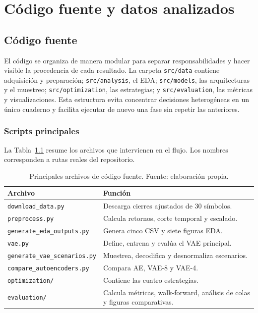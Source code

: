 \chapter{Código fuente y datos analizados}

\section{Código fuente}

El código se organiza de manera modular para separar responsabilidades y hacer visible la procedencia de cada resultado. La carpeta \texttt{src/data} contiene adquisición y preparación; \texttt{src/analysis}, el EDA; \texttt{src/models}, las arquitecturas y el muestreo; \texttt{src/optimization}, las estrategias; y \texttt{src/evaluation}, las métricas y visualizaciones. Esta estructura evita concentrar decisiones heterogéneas en un único cuaderno y facilita ejecutar de nuevo una fase sin repetir las anteriores.



\subsection{Scripts principales}

La Tabla~\ref{tab:codigo_fuente} resume los archivos que intervienen en el flujo. Los nombres corresponden a rutas reales del repositorio.

\begin{table}[htbp]
\centering
\scriptsize
\begin{tabular}{p{}p{}}
\toprule
Archivo & Función \\
\midrule
\texttt{download\_data.py} & Descarga cierres ajustados de 30 símbolos. \\
\texttt{preprocess.py} & Calcula retornos, corte temporal y escalado. \\
\texttt{generate\_eda\_outputs.py} & Genera cinco CSV y siete figuras EDA. \\
\texttt{vae.py} & Define, entrena y evalúa el VAE principal. \\
\texttt{generate\_vae\_scenarios.py} & Muestrea, decodifica y desnormaliza escenarios. \\
\texttt{compare\_autoencoders.py} & Compara AE, VAE-8 y VAE-4. \\
\texttt{optimization/} & Contiene las cuatro estrategias. \\
\texttt{evaluation/} & Calcula métricas, walk-forward, análisis de colas y figuras comparativas. \\
\bottomrule
\end{tabular}
\caption{Principales archivos de código fuente. Fuente: elaboración propia.}
\label{tab:codigo_fuente}
\end{table}


